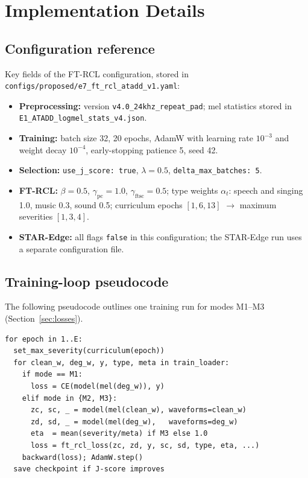 \chapter{Implementation Details}
\label{app:details}

\section{Configuration reference}
\label{app:config}

Key fields of the FT-RCL configuration, stored in\\\texttt{configs/proposed/e7\_ft\_rcl\_atadd\_v1.yaml}:
\begin{itemize}
  \item \textbf{Preprocessing:} version \texttt{v4.0\_24khz\_repeat\_pad}; mel statistics stored in\\\texttt{E1\_ATADD\_logmel\_stats\_v4.json}.
  \item \textbf{Training:} batch size 32, 20 epochs, AdamW with learning rate $10^{-3}$ and weight decay $10^{-4}$, early-stopping patience 5, seed 42.
  \item \textbf{Selection:} \texttt{use\_j\_score: true}, $\lambda = 0.5$, \texttt{delta\_max\_batches: 5}.
  \item \textbf{FT-RCL:} $\beta = 0.5$, $\gamma_{\mathrm{pc}} = 1.0$, $\gamma_{\mathrm{ftsc}} = 0.5$; type weights $\alpha_t$: speech and singing 1.0, music 0.3, sound 0.5; curriculum epochs $[1, 6, 13]$ $\rightarrow$ maximum severities $[1, 3, 4]$.
  \item \textbf{STAR-Edge:} all flags \texttt{false} in this configuration; the STAR-Edge run uses a separate configuration file.
\end{itemize}

\section{Training-loop pseudocode}
\label{app:pseudo}

The following pseudocode outlines one training run for modes M1--M3 (Section~\ref{sec:losses}).

\begingroup
\small
\begin{verbatim}
for epoch in 1..E:
  set_max_severity(curriculum(epoch))
  for clean_w, deg_w, y, type, meta in train_loader:
    if mode == M1:
      loss = CE(model(mel(deg_w)), y)
    elif mode in {M2, M3}:
      zc, sc, _ = model(mel(clean_w), waveforms=clean_w)
      zd, sd, _ = model(mel(deg_w),   waveforms=deg_w)
      eta  = mean(severity/meta) if M3 else 1.0
      loss = ft_rcl_loss(zc, zd, y, sc, sd, type, eta, ...)
    backward(loss); AdamW.step()
  save checkpoint if J-score improves
\end{verbatim}
\endgroup
